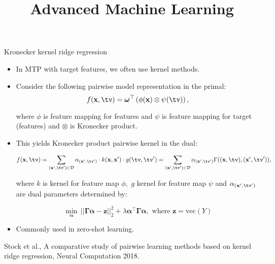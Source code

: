 \documentclass[11pt,compress,t,notes=noshow, xcolor=table]{beamer}
\title{Advanced Machine Learning}
\date{}
\begin{document}



\sloppy



\begin{frame}{Kronecker kernel ridge regression}
	\begin{itemize}

    	\item In MTP with target features, we often use kernel methods.
    
    	\item Consider the following pairwise model representation in the primal: 
    		\begin{equation*}
    			\label{eq:pairwise}
    			f(\xv,\tv) = \bm\omega^\top \left(\phi(\xv) \otimes \psi(\tv) \right) ,
    		\end{equation*}
    
    	where $\phi$ is feature mapping for features and $\psi$ is feature mapping for target (features) and $\otimes$ is Kronecker product. 
    
    	\item This yields Kronecker product pairwise kernel in the dual:
    	
    	\begin{eqnarray*} 
    		f(\xv,\tv)= \sum_{(\xv',\tv') \in \D} \alpha_{(\xv',\tv')}  \cdot  k(\xv,\xv') \cdot g(\tv,\tv')  = \sum_{(\xv',\tv') \in \D} \alpha_{(\xv',\tv')} \Gamma((\xv,\tv),(\xv',\tv')),
    	\end{eqnarray*}
    
    	where $k$ is kernel for feature map $\phi,$  $g$ kernel for feature map $\psi$  and $\alpha_{(\xv',\tv')}$ are dual parameters determined by:
    
    	$$ \min_{\bm{\alpha}} \, ||\bm{\Gamma}\bm{\alpha} -\bm{z} ||^2_2 +\lambda\bm{\alpha }^\top \bm{\Gamma}\bm{\alpha}, \text{ where } \bm{z} = \mathrm{vec}{(Y)}$$
    
    
    
    	\item Commonly used in zero-shot learning.

\end{itemize}

	{\tiny Stock et al., A comparative study of pairwise learning methods based on kernel ridge regression, Neural Computation 2018.}
%	
\end{frame}
\end{document}
